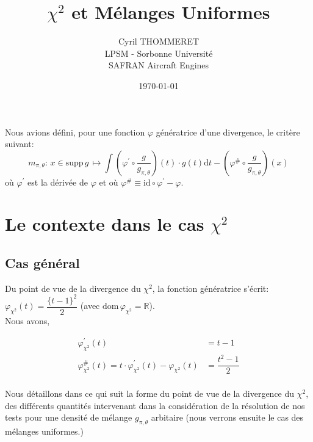 \documentclass{article}
\title{$\chi^2$ et Mélanges Uniformes}
\author{Cyril THOMMERET \\ LPSM - Sorbonne Université \\ SAFRAN Aircraft Engines}
\date{\today}
\begin{document}
    \maketitle
    \tableofcontents
    \vspace*{1.2cm}
    Nous avions défini, pour une fonction $\varphi$ génératrice d'une divergence, le critère suivant:
    $$ m_{\pi,\theta}:\, x\in\mathrm{supp}\,g\, \longmapsto \int(\varphi^\prime\circ\dfrac{g}{g_{\pi,\theta}})(t)\cdot{}g(t)\mathrm{d}t - (\varphi^\#\circ\dfrac{g}{g_{\pi,\theta}})(x)$$
    où $\varphi^\prime$ est la dérivée de $\varphi$ et où $\varphi^\#\equiv{}\mathrm{id}\circ\varphi^\prime - \varphi$. \\

    \section{Le contexte dans le cas $\chi^2$}
    \subsection{Cas général}

    Du point de vue de la divergence du $\chi^2$, la fonction génératrice s'écrit: $\varphi_{\chi^2}(t) = \dfrac{\{t-1\}^2}{2}$ (avec $\mathrm{dom}\,\varphi_{\chi^2}=\mathbb{R}$).\\
    
    Nous avons,

    \begin{align*}
        \varphi_{\chi^2}^\prime(t) & = t - 1 \\
        \varphi_{\chi^2}^\#(t) = t\cdot\varphi_{\chi^2}^\prime(t) - \varphi_{\chi^2}(t) & = \dfrac{t^2-1}{2} \\
    \end{align*}

    Nous détaillons dans ce qui suit la forme du point de vue de la divergence du $\chi^2$, des différents quantités intervenant dans la considération de la résolution de nos tests pour une densité de mélange $g_{\pi,\theta}$ arbitaire (nous verrons ensuite le cas des mélanges uniformes.)

\end{document}

